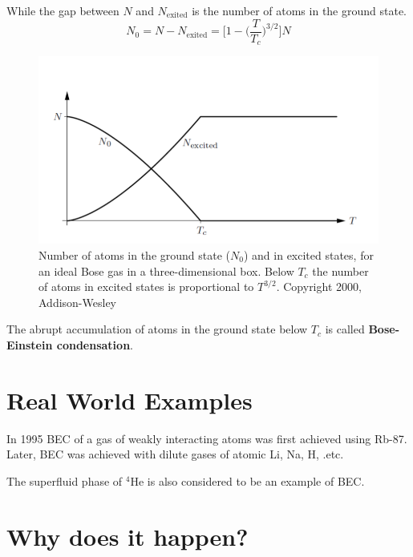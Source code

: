 While the gap between $N$ and $N_\textrm{exited}$ is the number of atoms in the ground state.
\begin{equation}
    N_0 = N-N_\textrm{exited} = \bigg[1-\bigg(\frac{T}{T_c}\bigg)^{3/2}\bigg]N
\end{equation}

\begin{figure}[ht]
\centering
\includegraphics[width=0.8\linewidth]{imgs/BEC2.png}
\caption{Number of atoms in the ground state ($N_0$) and in excited states,
for an ideal Bose gas in a three-dimensional box. Below $T_c$ the number of atoms in excited states is proportional to $T^{3/2}$. Copyright 2000, Addison-Wesley}
\end{figure}

The abrupt accumulation of atoms in the ground state below $T_c$ is called \textbf{Bose-Einstein condensation}.

\section{Real World Examples}
In 1995 BEC of a gas of weakly interacting atoms was first achieved using Rb-87. Later, BEC was achieved with dilute gases of atomic Li, Na, H, .etc.

The superfluid phase of $^4$He is also considered to be an example of BEC.

\section{Why does it happen?}



